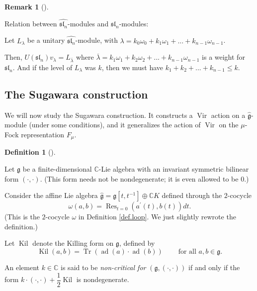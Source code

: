 \documentclass
[numbers=enddot,12pt,final,onecolumn,german,notitlepage]{scrartcl}%
\theoremstyle{definition}
\newtheorem{defi}[theo]{Definition}
\newenvironment{definition}[1][]
{\begin{defi}[#1]\begin{leftbar}}
{\end{leftbar}\end{defi}}
\newtheorem{remk}[theo]{Remark}
\newenvironment{remark}[1][]
{\begin{remk}[#1]\begin{leftbar}}
{\end{leftbar}\end{remk}}
\begin{document}
\begin{remark}
Relation between $\widehat{\mathfrak{sl}_{n}}$-modules and $\mathfrak{sl}_{n}$-modules:

Let $L_{\lambda}$ be a unitary $\widehat{\mathfrak{sl}_{n}}$-module, with
$\lambda=k_{0}\omega_{0}+k_{1}\omega_{1}+...+k_{n-1}\omega_{n-1}$.

Then, $U\left(  \mathfrak{sl}_{n}\right)  v_{\lambda}=L_{\overline{\lambda}}$
where $\overline{\lambda}=k_{1}\omega_{1}+k_{2}\omega_{2}+...+k_{n-1}%
\omega_{n-1}$ is a weight for $\mathfrak{sl}_{n}$. And if the level of
$L_{\lambda}$ was $k$, then we must have $k_{1}+k_{2}+...+k_{n-1}\leq k$.
\end{remark}

\subsection{The Sugawara construction}

We will now study the Sugawara construction. It constructs a
$\operatorname*{Vir}$ action on a $\widehat{\mathfrak{g}}$-module (under some
conditions), and it generalizes the action of $\operatorname*{Vir}$ on the
$\mu$-Fock representation $F_{\mu}$.

\begin{definition}
\label{def.sugawara}Let $\mathfrak{g}$ be a finite-dimensional $\mathbb{C}%
$-Lie algebra with an invariant symmetric bilinear form $\left(  \cdot
,\cdot\right)  $. (This form needs not be nondegenerate; it is even allowed to
be $0$.)

Consider the affine Lie algebra $\widehat{\mathfrak{g}}=\mathfrak{g}\left[
t,t^{-1}\right]  \oplus\mathbb{C}K$ defined through the $2$-cocycle
\[
\omega\left(  a,b\right)  =\operatorname*{Res}\nolimits_{t=0}\left(
a^{\prime}\left(  t\right)  ,b\left(  t\right)  \right)  dt.
\]
(This is the $2$-cocycle $\omega$ in Definition \ref{def.loop}. We just
slightly rewrote the definition.)

Let $\operatorname*{Kil}$ denote the Killing form on $\mathfrak{g}$, defined
by
\[
\operatorname*{Kil}\left(  a,b\right)  =\operatorname*{Tr}\left(
\operatorname*{ad}\left(  a\right)  \cdot\operatorname*{ad}\left(  b\right)
\right)  \ \ \ \ \ \ \ \ \ \ \text{for all }a,b\in\mathfrak{g}.
\]


An element $k\in\mathbb{C}$ is said to be \textit{non-critical for }$\left(
\mathfrak{g},\left(  \cdot,\cdot\right)  \right)  $ if and only if the form
$k\cdot\left(  \cdot,\cdot\right)  +\dfrac{1}{2}\operatorname*{Kil}$ is nondegenerate.
\end{definition}
\end{document}
